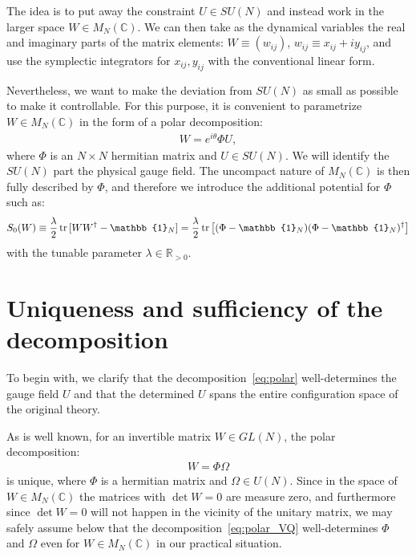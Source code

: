 \documentclass[12pt]{article}
\begin{document}
The idea is to put away the constraint $U \in SU(N)$
and instead work in the larger space $W \in M_N(\mathbb{C})$.
We can then take as the dynamical variables the real and imaginary parts
of the matrix elements:
$W \equiv (w_{ij})$, $w_{ij} \equiv x_{ij}+iy_{ij}$,
and use the symplectic integrators
for $x_{ij}, y_{ij}$ with the conventional linear form.

Nevertheless, we want to make the deviation
from $SU(N)$ as small as possible
to make it controllable.
For this purpose, it is convenient to parametrize $W \in M_N(\mathbb{C})$
in the form of a polar decomposition:
\begin{align}
  W = e^{i\theta} \Phi U,
  \label{eq:polar}
\end{align}
where $\Phi$ is an $N\times N$ hermitian matrix and $U \in SU(N)$.
We will identify the $SU(N)$ part the physical gauge field.
The uncompact nature of $M_N(\mathbb{C})$ is then fully described by $\Phi$,
and therefore we introduce the additional potential
for $\Phi$ such as:
\begin{align}
  S_0(W)
  \equiv \frac{\lambda}{2} \, {\rm tr} \,[W W^\dagger-\mathbb{1}_N]
  = \frac{\lambda}{2} \,{\rm tr} \,
  \big[
  (\Phi-\mathbb{1}_N)(\Phi-\mathbb{1}_N)^\dagger
  \big]
  \label{eq:s0}
\end{align}
with the tunable parameter $\lambda \in \mathbb{R}_{>0}$.


\section{Uniqueness and sufficiency of the decomposition}
\label{sec:polar}

To begin with,
we clarify that the decomposition~\eqref{eq:polar}
well-determines the gauge field $U$ and
that the determined $U$ spans the entire configuration space
of the original theory.

As is well known, for an invertible matrix $W \in GL(N)$,
the polar decomposition:
\begin{align}
  W = \Phi \Omega
  \label{eq:polar_VQ}
\end{align}
is unique, where $\Phi$ is a hermitian matrix and $\Omega \in U(N)$.
Since in the space of $W \in M_N(\mathbb{C})$
the matrices with $\det W=0$ are measure zero,
and furthermore since $\det W=0$ will not
happen in the vicinity of the unitary matrix,
we may safely assume below
that the decomposition~\eqref{eq:polar_VQ}
well-determines $\Phi$ and $\Omega$
even for $W \in M_N(\mathbb{C})$
in our practical situation.
\end{document}
